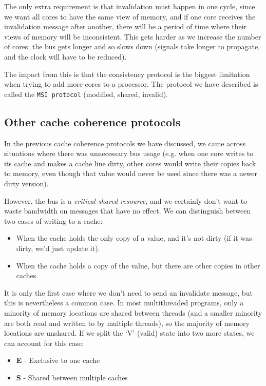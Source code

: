 The only extra requirement is that invalidation must happen in one cycle, since
we want all cores to have the same view of memory, and if one core receives the
invalidation message after another, there will be a period of time where their
views of memory will be inconsistent. This gets harder as we increase the number
of cores; the bus gets longer and so slows down (signals take longer to
propagate, and the clock will have to be reduced).

The impact from this is that the consistency protocol is the biggest limitation
when trying to add more cores to a processor. The protocol we have described is
called the \texttt{MSI protocol} (modified, shared, invalid).


\subsection{Other cache coherence protocols}

In the previous cache coherence protocols we have discussed, we came across
situations where there was unnecessary bus usage (e.g. when one core writes to
its cache and makes a cache line dirty, other cores would write their copies
back to memory, even though that value would never be used since there was a
newer dirty version).

However, the bus is a \textit{critical shared resource}, and we certainly don't
want to waste bandwidth on messages that have no effect. We can distinguish
between two cases of writing to a cache:

\begin{itemize}
  \item When the cache holds the only copy of a value, and it's not dirty (if it
  was dirty, we'd just update it).
  \item When the cache holds a copy of the value, but there are other copies in
  other caches.
\end{itemize}

It is only the first case where we don't need to send an invalidate message, but
this is nevertheless a common case. In most multithreaded programs, only a
minority of memory locations are shared between threads (and a smaller minority
are both read and written to by multiple threads), so the majority of memory
locations are unshared. If we split the `V' (valid) state into two more states,
we can account for this case:

\begin{itemize}
  \item \textbf{E} - Exclusive to one cache
  \item \textbf{S} - Shared between multiple caches
\end{itemize}


